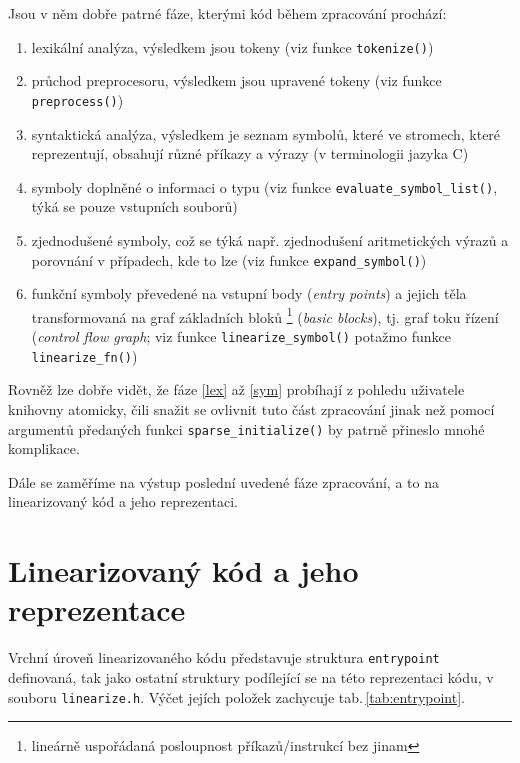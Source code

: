 Jsou v něm dobře patrné fáze, kterými kód během zpracování prochází:
\begin{enumerate}
    \item\label{lex} lexikální analýza, výsledkem jsou tokeny (viz funkce \texttt{tokenize()})
    \item průchod preprocesoru, výsledkem jsou upravené tokeny (viz funkce \texttt{preprocess()})
    \item syntaktická analýza, výsledkem je seznam symbolů,
          které ve stromech, které reprezentují, obsahují různé
          příkazy a výrazy (v terminologii jazyka C)
    \item\label{sym} symboly doplněné o informaci o typu (viz funkce \texttt{evaluate\_symbol\_list()},
          týká se pouze vstupních souborů)
    \item zjednodušené symboly, což se týká např. zjednodušení aritmetických výrazů
          a porovnání v případech, kde to lze (viz funkce \texttt{expand\_symbol()})
    \item funkční symboly převedené na vstupní body (\emph{entry points})
          a jejich těla transformovaná na graf základních bloků%
          \footnote{lineárně uspořádaná posloupnost příkazů/instrukcí bez  jinam}
          (\emph{basic blocks}), tj. graf toku řízení (\emph{control flow graph};
          viz funkce \texttt{linearize\_symbol()} potažmo funkce \texttt{linearize\_fn()})
\end{enumerate}

Rovněž lze dobře vidět, že fáze \ref{lex} až \ref{sym} probíhají z pohledu
uživatele knihovny atomicky, čili snažit se ovlivnit tuto část zpracování
jinak než pomocí argumentů předaných funkci \texttt{sparse\_initialize()}
by patrně přineslo mnohé komplikace.

Dále se zaměříme na výstup poslední uvedené fáze zpracování, a to na linearizovaný
kód a jeho reprezentaci.

\section{Linearizovaný kód a jeho reprezentace}

Vrchní úroveň linearizovaného kódu představuje struktura \texttt{entrypoint}
definovaná, tak jako ostatní struktury podílející se na této
reprezentaci kódu, v souboru \texttt{linearize.h}. Výčet jejích položek
zachycuje tab.\,\ref{tab:entrypoint}.

